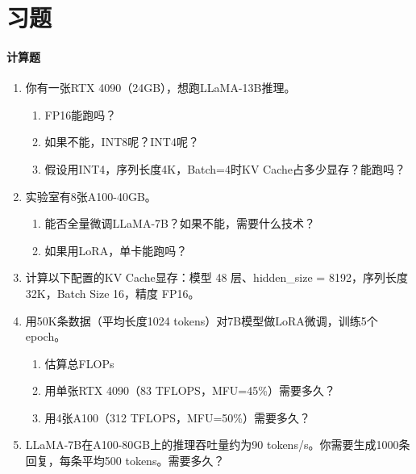 \section*{习题}

\paragraph{计算题}

\begin{enumerate}
    \item 你有一张RTX 4090（24GB），想跑LLaMA-13B推理。
    \begin{enumerate}
        \item FP16能跑吗？
        \item 如果不能，INT8呢？INT4呢？
        \item 假设用INT4，序列长度4K，Batch=4时KV Cache占多少显存？能跑吗？
    \end{enumerate}
    
    \item 实验室有8张A100-40GB。
    \begin{enumerate}
        \item 能否全量微调LLaMA-7B？如果不能，需要什么技术？
        \item 如果用LoRA，单卡能跑吗？
    \end{enumerate}
    
        \item 计算以下配置的KV Cache显存：模型 48 层、hidden\_size = 8192，序列长度 32K，Batch Size 16，精度 FP16。
\end{enumerate}

\begin{enumerate}
    \setcounter{enumi}{3}
    
    \item 用50K条数据（平均长度1024 tokens）对7B模型做LoRA微调，训练5个epoch。
    \begin{enumerate}
        \item 估算总FLOPs
        \item 用单张RTX 4090（83 TFLOPS，MFU=45\%）需要多久？
        \item 用4张A100（312 TFLOPS，MFU=50\%）需要多久？
    \end{enumerate}
    
    \item LLaMA-7B在A100-80GB上的推理吞吐量约为90 tokens/s。你需要生成1000条回复，每条平均500 tokens。需要多久？
\end{enumerate}

